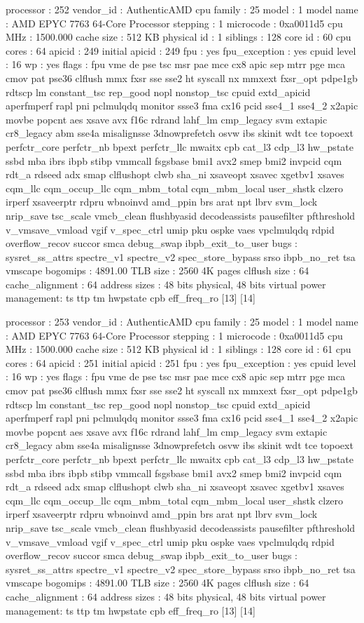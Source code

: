 processor	: 252
vendor_id	: AuthenticAMD
cpu family	: 25
model		: 1
model name	: AMD EPYC 7763 64-Core Processor
stepping	: 1
microcode	: 0xa0011d5
cpu MHz		: 1500.000
cache size	: 512 KB
physical id	: 1
siblings	: 128
core id		: 60
cpu cores	: 64
apicid		: 249
initial apicid	: 249
fpu		: yes
fpu_exception	: yes
cpuid level	: 16
wp		: yes
flags		: fpu vme de pse tsc msr pae mce cx8 apic sep mtrr pge mca cmov pat pse36 clflush mmx fxsr sse sse2 ht syscall nx mmxext fxsr_opt pdpe1gb rdtscp lm constant_tsc rep_good nopl nonstop_tsc cpuid extd_apicid aperfmperf rapl pni pclmulqdq monitor ssse3 fma cx16 pcid sse4_1 sse4_2 x2apic movbe popcnt aes xsave avx f16c rdrand lahf_lm cmp_legacy svm extapic cr8_legacy abm sse4a misalignsse 3dnowprefetch osvw ibs skinit wdt tce topoext perfctr_core perfctr_nb bpext perfctr_llc mwaitx cpb cat_l3 cdp_l3 hw_pstate ssbd mba ibrs ibpb stibp vmmcall fsgsbase bmi1 avx2 smep bmi2 invpcid cqm rdt_a rdseed adx smap clflushopt clwb sha_ni xsaveopt xsavec xgetbv1 xsaves cqm_llc cqm_occup_llc cqm_mbm_total cqm_mbm_local user_shstk clzero irperf xsaveerptr rdpru wbnoinvd amd_ppin brs arat npt lbrv svm_lock nrip_save tsc_scale vmcb_clean flushbyasid decodeassists pausefilter pfthreshold v_vmsave_vmload vgif v_spec_ctrl umip pku ospke vaes vpclmulqdq rdpid overflow_recov succor smca debug_swap ibpb_exit_to_user
bugs		: sysret_ss_attrs spectre_v1 spectre_v2 spec_store_bypass srso ibpb_no_ret tsa vmscape
bogomips	: 4891.00
TLB size	: 2560 4K pages
clflush size	: 64
cache_alignment	: 64
address sizes	: 48 bits physical, 48 bits virtual
power management: ts ttp tm hwpstate cpb eff_freq_ro [13] [14]

processor	: 253
vendor_id	: AuthenticAMD
cpu family	: 25
model		: 1
model name	: AMD EPYC 7763 64-Core Processor
stepping	: 1
microcode	: 0xa0011d5
cpu MHz		: 1500.000
cache size	: 512 KB
physical id	: 1
siblings	: 128
core id		: 61
cpu cores	: 64
apicid		: 251
initial apicid	: 251
fpu		: yes
fpu_exception	: yes
cpuid level	: 16
wp		: yes
flags		: fpu vme de pse tsc msr pae mce cx8 apic sep mtrr pge mca cmov pat pse36 clflush mmx fxsr sse sse2 ht syscall nx mmxext fxsr_opt pdpe1gb rdtscp lm constant_tsc rep_good nopl nonstop_tsc cpuid extd_apicid aperfmperf rapl pni pclmulqdq monitor ssse3 fma cx16 pcid sse4_1 sse4_2 x2apic movbe popcnt aes xsave avx f16c rdrand lahf_lm cmp_legacy svm extapic cr8_legacy abm sse4a misalignsse 3dnowprefetch osvw ibs skinit wdt tce topoext perfctr_core perfctr_nb bpext perfctr_llc mwaitx cpb cat_l3 cdp_l3 hw_pstate ssbd mba ibrs ibpb stibp vmmcall fsgsbase bmi1 avx2 smep bmi2 invpcid cqm rdt_a rdseed adx smap clflushopt clwb sha_ni xsaveopt xsavec xgetbv1 xsaves cqm_llc cqm_occup_llc cqm_mbm_total cqm_mbm_local user_shstk clzero irperf xsaveerptr rdpru wbnoinvd amd_ppin brs arat npt lbrv svm_lock nrip_save tsc_scale vmcb_clean flushbyasid decodeassists pausefilter pfthreshold v_vmsave_vmload vgif v_spec_ctrl umip pku ospke vaes vpclmulqdq rdpid overflow_recov succor smca debug_swap ibpb_exit_to_user
bugs		: sysret_ss_attrs spectre_v1 spectre_v2 spec_store_bypass srso ibpb_no_ret tsa vmscape
bogomips	: 4891.00
TLB size	: 2560 4K pages
clflush size	: 64
cache_alignment	: 64
address sizes	: 48 bits physical, 48 bits virtual
power management: ts ttp tm hwpstate cpb eff_freq_ro [13] [14]

